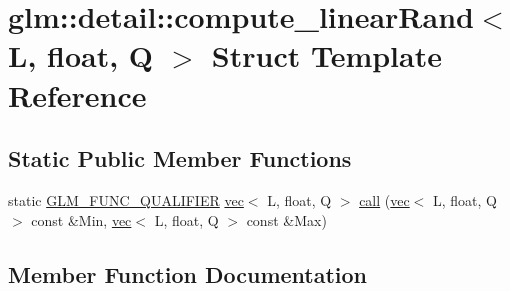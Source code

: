 \hypertarget{structglm_1_1detail_1_1compute__linear_rand_3_01_l_00_01float_00_01_q_01_4}{}\section{glm\+:\+:detail\+:\+:compute\+\_\+linear\+Rand$<$ L, float, Q $>$ Struct Template Reference}
\label{structglm_1_1detail_1_1compute__linear_rand_3_01_l_00_01float_00_01_q_01_4}
\subsection*{Static Public Member Functions}
\begin{DoxyCompactItemize}
\item 
static \mbox{\hyperlink{setup_8hpp_a33fdea6f91c5f834105f7415e2a64407}{G\+L\+M\+\_\+\+F\+U\+N\+C\+\_\+\+Q\+U\+A\+L\+I\+F\+I\+ER}} \mbox{\hyperlink{structglm_1_1vec}{vec}}$<$ L, float, Q $>$ \mbox{\hyperlink{structglm_1_1detail_1_1compute__linear_rand_3_01_l_00_01float_00_01_q_01_4_a3319a6af7a1c260138de2d75152e56a6}{call}} (\mbox{\hyperlink{structglm_1_1vec}{vec}}$<$ L, float, Q $>$ const \&Min, \mbox{\hyperlink{structglm_1_1vec}{vec}}$<$ L, float, Q $>$ const \&Max)
\end{DoxyCompactItemize}


\subsection{Member Function Documentation}
\mbox{\label{structglm_1_1detail_1_1compute__linear_rand_3_01_l_00_01float_00_01_q_01_4_a3319a6af7a1c260138de2d75152e56a6}} 
